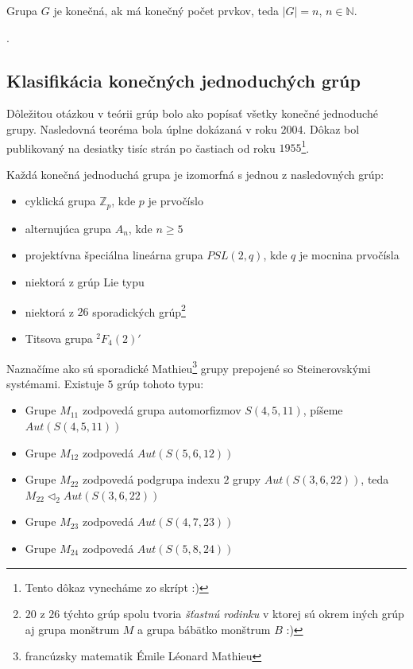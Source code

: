 \begin{definition}
Grupa $G$ je konečná, ak má konečný počet prvkov, teda $\lvert G \rvert = n$, $n \in \mathbb{N}$.
\end{definition}.

\subsection{Klasifikácia konečných jednoduchých grúp}

Dôležitou otázkou v teórii grúp bolo ako popísať všetky konečné jednoduché grupy. Nasledovná teoréma bola úplne dokázaná v roku $2004$. Dôkaz bol publikovaný na desiatky tisíc strán po častiach od roku $1955$\footnote{Tento dôkaz vynecháme zo skrípt :)}.

\begin{theorem_hard}
	Každá konečná jednoduchá grupa je izomorfná s jednou z nasledovných grúp:
	\begin{itemize}
		\item cyklická grupa $\mathbb{Z}_p$, kde $p$ je prvočíslo
		\item alternujúca grupa $A_n$, kde $n \geq 5$
		\item projektívna špeciálna lineárna grupa $PSL(2, q)$, kde $q$ je mocnina prvočísla
		\item niektorá z grúp Lie typu
		\item niektorá z $26$ sporadických grúp\footnote{$20$ z $26$ týchto grúp spolu tvoria \textit{šťastnú rodinku} v ktorej sú okrem iných grúp aj grupa monštrum $M$ a grupa bábätko monštrum $B$ :)}
		\item Titsova grupa $^2F_4(2)'$
	\end{itemize}
\end{theorem_hard}

Naznačíme ako sú sporadické Mathieu\footnote{francúzsky matematik Émile Léonard Mathieu} grupy prepojené so Steinerovskými systémami. Existuje $5$ grúp tohoto typu:

\begin{itemize}
	\item Grupe $M_{11}$ zodpovedá grupa automorfizmov $S(4,5,11)$, píšeme $Aut(S(4,5,11))$ 	
	\item Grupe $M_{12}$ zodpovedá $Aut(S(5,6,12))$
	\item Grupe $M_{22}$ zodpovedá podgrupa indexu $2$ grupy $Aut(S(3,6,22))$, teda $M_{22} \triangleleft_2 Aut(S(3,6,22))$
	\item Grupe $M_{23}$ zodpovedá $Aut(S(4,7,23))$
	\item Grupe $M_{24}$ zodpovedá $Aut(S(5,8,24))$
\end{itemize}